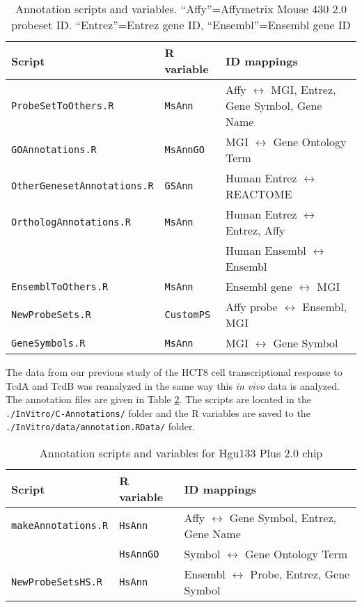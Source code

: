 \begin{table}[h]
  \begin{center}
    \begin{tabular}{ l | l | l }
      Script   &    R variable    &    ID mappings   \\ \hline
      \texttt{ProbeSetToOthers.R} & \texttt{MsAnn} & Affy $\leftrightarrow$ MGI, Entrez, Gene Symbol, Gene Name \\                                              
      \texttt{GOAnnotations.R} & \texttt{MsAnnGO} & MGI $\leftrightarrow$ Gene Ontology Term \\
      \texttt{OtherGenesetAnnotations.R} & \texttt{GSAnn} & Human Entrez $\leftrightarrow$ REACTOME \\
      \texttt{OrthologAnnotations.R} & \texttt{MsAnn} & Human Entrez $\leftrightarrow$ Entrez, Affy \\
      \texttt{} & & Human Ensembl $\leftrightarrow$ Ensembl \\
      \texttt{EnsemblToOthers.R} & \texttt{MsAnn} & Ensembl gene $\leftrightarrow$ MGI \\
      \texttt{NewProbeSets.R} & \texttt{CustomPS} & Affy probe $\leftrightarrow$ Ensembl, MGI \\
      \texttt{GeneSymbols.R} & \texttt{MsAnn} & MGI $\leftrightarrow$ Gene Symbol
    \end{tabular}
    \caption{Annotation scripts and variables. ``Affy''=Affymetrix
             Mouse 430 2.0 probeset ID. ``Entrez''=Entrez gene ID,
             ``Ensembl''=Ensembl gene ID}\label{Ta:annotations}
  \end{center}
\end{table}

The data from our previous study of the HCT8 cell transcriptional response 
to TcdA and TcdB was reanalyzed in the same way this \emph{in vivo} data is analyzed. 
The annotation files are given in Table \ref{Ta:HSannotations}. The scripts are located in the 
\texttt{./InVitro/C-Annotations/} folder and the R variables are saved to the
\texttt{./InVitro/data/annotation.RData/} folder.

\begin{table}[h]
  \begin{center}
    \begin{tabular}{ l | l | l }
      Script   &    R variable    &    ID mappings   \\ \hline                                         
      \texttt{makeAnnotations.R} & \texttt{HsAnn} & Affy $\leftrightarrow$ Gene Symbol, Entrez, Gene Name \\
      \texttt{} & \texttt{HsAnnGO} & Symbol $\leftrightarrow$ Gene Ontology Term \\
      \texttt{NewProbeSetsHS.R} & \texttt{HsAnn} & Ensembl $\leftrightarrow$ Probe, Entrez, Gene Symbol \\
    \end{tabular}
    \caption{Annotation scripts and variables for Hgu133 Plus 2.0 chip }\label{Ta:HSannotations}
  \end{center}
\end{table}

